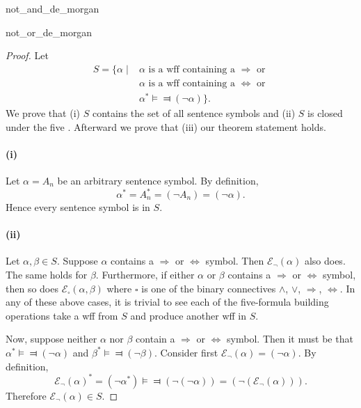 \documentclass{report}
\begin{document}
    {not\_and\_de\_morgan}

    {not\_or\_de\_morgan}

  \begin{proof}

    Let
      \begin{align*}
        S = \{ \alpha \mid
          & \alpha \text{ is a wff containing a } \Rightarrow \text{ or } \\
          & \alpha \text{ is a wff containing a } \Leftrightarrow \text{ or } \\
          & \alpha^* \vDash \Dashv (\neg\alpha) \}.
      \end{align*}
    We prove that (i) $S$ contains the set of all sentence symbols and (ii) $S$
      is closed under the five .
    Afterward we prove that (iii) our theorem statement holds.

    \paragraph{(i)}%

      Let $\alpha = A_n$ be an arbitrary sentence symbol.
      By definition, $$\alpha^* = A_n^* = (\neg A_n) = (\neg\alpha).$$
      Hence every sentence symbol is in $S$.

    \paragraph{(ii)}%

      Let $\alpha, \beta \in S$.
      Suppose $\alpha$ contains a $\Rightarrow$ or $\Leftrightarrow$ symbol.
      Then $\mathcal{E}_{\neg}(\alpha)$ also does.
      The same holds for $\beta$.
      Furthermore, if either $\alpha$ or $\beta$ contains a $\Rightarrow$ or
        $\Leftrightarrow$ symbol, then so does
        $\mathcal{E}_{\square}(\alpha, \beta)$
        where $\square$ is one of the binary connectives $\land$, $\lor$,
          $\Rightarrow$, $\Leftrightarrow$.
      In any of these above cases, it is trivial to see each of the five-formula
        building operations take a wff from $S$ and produce another wff in $S$.

      Now, suppose neither $\alpha$ nor $\beta$ contain a $\Rightarrow$ or
        $\Leftrightarrow$ symbol.
      Then it must be that $\alpha^* \vDash\Dashv (\neg\alpha)$ and
        $\beta^* \vDash\Dashv (\neg\beta)$.
      Consider first $\mathcal{E}_{\neg}(\alpha) = (\neg\alpha)$.
      By definition,
        $$\mathcal{E}_{\neg}(\alpha)^*
          = (\neg\alpha^*)
          \vDash\Dashv (\neg(\neg\alpha))
          = (\neg(\mathcal{E}_{\neg}(\alpha))).$$
      Therefore $\mathcal{E}_{\neg}(\alpha) \in S$.


\end{proof}
\end{document}
